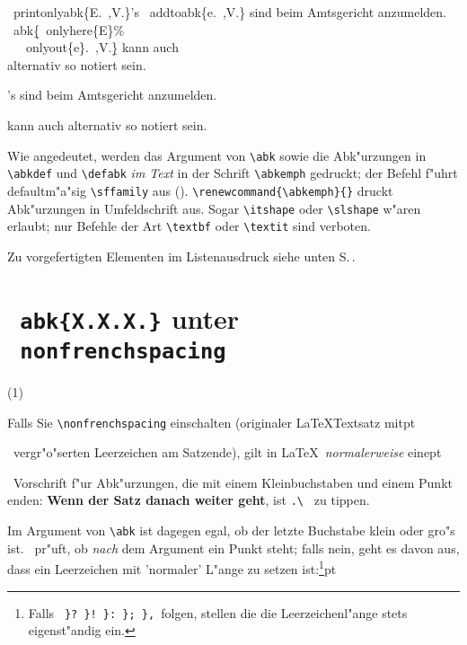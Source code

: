 \documentclass[12pt,a4paper]{article}
\newcommand{\pdfko}[1]{\kern #1pt
                          \strut\ignorespaces}%
\newcommand{\pbs}{\string\ \unskip}
\newcommand{\bs}{\protect\pbs}
\begin{document}
\Doppelbox
{\vspace{.25ex}
 \bs printonlyabk\{E.\bs,V.\}\string's \bs addtoabk\{e.\bs,V.\} 
 sind beim Amtsgericht anzumelden. 
 \\[2ex]
 \bs abk\b{\{}\bs onlyhere\{E\}\%
  \\ \ \ \bs onlyout\{e\}.\bs,V.\b{\}} kann auch
 \\ alternativ so notiert sein.
 \vspace{.25ex}
}
{'s  
 sind beim Amtsgericht anzumelden. 
 
 \vspace{1.1ex}
  kann auch
         alternativ so notiert sein.
}

\vspace{.25ex}\noindent
Wie angedeutet, werden das Argument von \verb|\abk| sowie
die Abk"urzungen in \verb|\abkdef| und \verb|\defabk| \textit{im Text} 
in der Schrift \verb|\abkemph| gedruckt; der Befehl f"uhrt
defaultm"a"sig \verb|\sffamily| aus ({}). 
\verb|\renewcommand{\abkemph}{}| druckt Abk"urzungen in
Umfeldschrift aus. Sogar \verb|\itshape| oder \verb|\slshape| w"aren erlaubt; 
nur Befehle der Art \verb|\textbf| oder \verb|\textit| sind verboten.

\vfill\noindent
\textsf{Zu vorgefertigten Elementen im Listenausdruck siehe unten S.\,\pageref{Erklaerung}.}


\newpage
\section{\texttt{\bs abk\{X.X.X.\}} unter \texttt{\bs nonfrenchspacing}}\label{Sect5}\label{nonfrenchspacing}

\parbox{1.8em}{(1)}Falls Sie \verb|\nonfrenchspacing| einschalten (originaler 
\LaTeX\hy Textsatz mit\pdfko{1.25}\
vergr"o"serten Leerzeichen am Satzende), gilt in \LaTeX\ \textit{normalerweise} eine\pdfko{1.75}\ 
Vorschrift f"ur Abk"urzungen, die mit einem Kleinbuchstaben und einem
Punkt enden: \textbf{Wenn der Satz danach weiter geht}, ist 
\verb*|.\ |\hspace{.2em} zu tippen. 

Im Argument von \verb|\abk| ist dagegen egal, ob der letzte Buchstabe klein oder gro"s ist. 
\BibArts\ pr"uft, ob \textit{nach} dem Argument ein Punkt steht; falls nein, geht es davon aus, 
dass ein Leerzeichen mit 'normaler' L"ange zu setzen ist:\footnote{Falls
\texttt{ \}? \}! \}: \}; \}, }folgen, stellen die die Leerzeichenl"ange stets eigenst"andig 
ein.}\pdfko{1}
\end{document}

